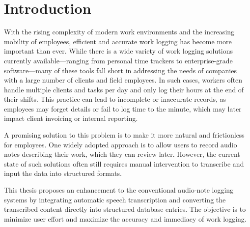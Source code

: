 \documentclass[
  digital,     %
  oneside,     %
  nosansbold,  %
  nocolorbold, %
  lof,         %
  lot,         %
]{fithesis4}
\begin{document}
\chapter*{Introduction}
With the rising complexity of modern work environments and the increasing mobility of employees, efficient and accurate work logging has become more important than ever. While there is a wide variety of work logging solutions currently available—ranging from personal time trackers to enterprise-grade software—many of these tools fall short in addressing the needs of companies with a large number of clients and field employees. In such cases, workers often handle multiple clients and tasks per day and only log their hours at the end of their shifts. This practice can lead to incomplete or inaccurate records, as employees may forget details or fail to log time to the minute, which may later impact client invoicing or internal reporting.

A promising solution to this problem is to make it more natural and frictionless for employees. One widely adopted approach is to allow users to record audio notes describing their work, which they can review later. However, the current state of such solutions often still requires manual intervention to transcribe and input the data into structured formats.

This thesis proposes an enhancement to the conventional audio-note logging systems by integrating automatic speech transcription and converting the transcribed content directly into structured database entries. The objective is to minimize user effort and maximize the accuracy and immediacy of work logging.
\end{document}

